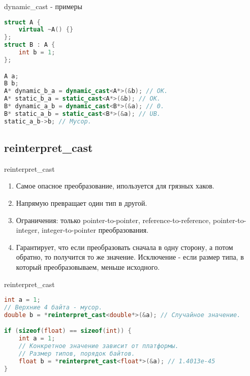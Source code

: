 \documentclass[10pt]{beamer}
\begin{document}
\begin{frame}[fragile]{dynamic\_cast - примеры}
\begin{lstlisting}[language=C++]
struct A {
    virtual ~A() {}
};
struct B : A {
    int b = 1;
};

A a;
B b;
A* dynamic_b_a = dynamic_cast<A*>(&b); // OK.
A* static_b_a = static_cast<A*>(&b); // OK.
B* dynamic_a_b = dynamic_cast<B*>(&a); // 0.
B* static_a_b = static_cast<B*>(&a); // UB.
static_a_b->b; // Мусор.
\end{lstlisting}
\end{frame}


\subsection{reinterpret\_cast}
\begin{frame}[fragile]{reinterpret\_cast}
\begin{enumerate}
    \item Самое опасное преобразование, ипользуется для грязных хаков.
    \item Напрямую превращает один тип в другой.
    \item Ограничения: только pointer-to-pointer, reference-to-reference, pointer-to-integer, integer-to-pointer преобразования.
    \item Гарантирует, что если преобразовать сначала в одну сторону, а потом обратно, то получится то же значение. Исключение - если размер типа, в который преобразовываем, меньше исходного.
\end{enumerate}
\end{frame}

\begin{frame}[fragile]{reinterpret\_cast}
\begin{lstlisting}[language=C++]
int a = 1;
// Верхние 4 байта - мусор.
double b = *reinterpret_cast<double*>(&a); // Случайное значение.

if (sizeof(float) == sizeof(int)) {
    int a = 1;
    // Конкретное значение зависит от платформы.
    // Размер типов, порядок байтов.
    float b = *reinterpret_cast<float*>(&a); // 1.4013e-45
}
\end{lstlisting}
\end{frame}
\end{document}
